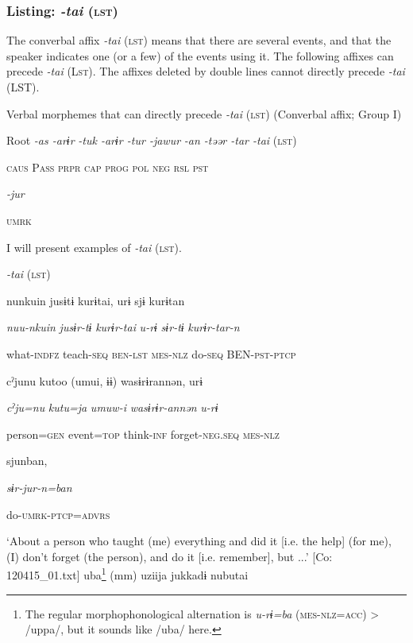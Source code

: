 \subsubsection{Listing: \textit{{}-tai} (\textsc{lst})}

The converbal affix \textit{{}-tai} (\textsc{lst}) means that there are several events, and that the speaker indicates one (or a few) of the events using it. The following affixes can precede \textit{{}-tai} (L\textsc{st}). The affixes deleted by double lines cannot directly precede \textit{{}-tai} (LST).

\ea\label{ex:8-92}
  Verbal morphemes that can directly precede \textit{{}-tai} (\textsc{lst}) (Converbal affix; Group I)

  Root  \textit{{}-as  {}-arɨr} %
\textit{{}-tuk  {}-arɨr  {}-tur  {}-jawur} %
\textit{{}-an  {}-təər  {}-tar  {}-tai} (\textsc{lst})

    \textsc{caus}  P\textsc{ass}  \textsc{prpr}  \textsc{cap}  \textsc{prog}  \textsc{pol}  \textsc{neg}  \textsc{rsl}  \textsc{pst}

          \textit{{}-jur} 

          \textsc{umrk}

I will present examples of \textit{{}-tai} (\textsc{lst}).

\ea\label{ex:8-93}
  \textit{{}-tai} (\textsc{lst})

\ea {\TM}
\glll  nunkuin  jusɨtɨ  kurɨtai,  urɨ  sjɨ  kurɨtan

      \textit{nuu-nkuin}  \textit{jusɨr-tɨ}  \textit{kurɨr-tai}  \textit{u-rɨ}  \textit{sɨr-tɨ}  \textit{kurɨr-tar-n}

      what-\textsc{indfz}  teach-\textsc{seq}  \textsc{ben}-\textsc{lst}  \textsc{mes}-\textsc{nlz}  do-\textsc{seq}  BEN-\textsc{pst}-\textsc{ptcp}

      cˀjunu  kutoo  (umui,  ɨɨ)  wasɨrɨrannən,  urɨ

      \textit{cˀju=nu}  \textit{kutu=ja}  \textit{umuw-i}    \textit{wasɨrɨr-annən}  \textit{u-rɨ}

      person=\textsc{gen}  event=\textsc{top}  think-\textsc{inf}    forget-\textsc{neg}.\textsc{seq}  \textsc{mes}-\textsc{nlz}

      sjunban,

      \textit{sɨr-jur-n=ban}

      do-\textsc{umrk}-\textsc{ptcp}=\textsc{advrs}

\glt ‘About a person who taught (me) everything and did it [i.e. the help] (for me), (I) don’t forget (the person), and do it [i.e. remember], but ...’ [Co: 120415\_01.txt]
\ex {\TM}
\glll  uba\footnote{The regular morphophonological alternation is \textit{u-rɨ=ba} (\textsc{mes}-\textsc{nlz}=\textsc{acc}) > /uppa/, but it sounds like /uba/ here.}  (mm)  uziija  jukkadɨ  nubutai

